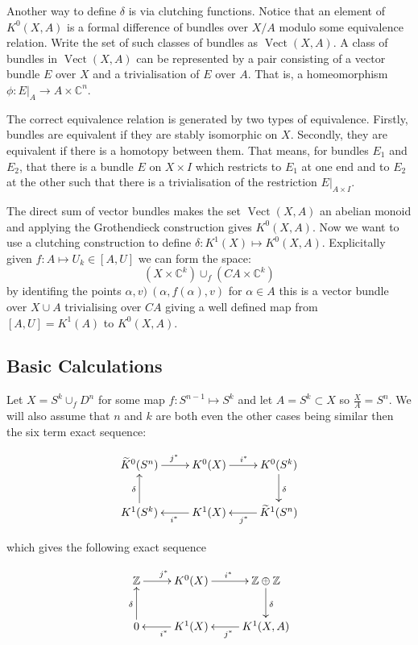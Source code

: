 \documentclass[a4paper,10pt]{article}
\theoremstyle{plain}%
\theoremstyle{definition}
\theoremstyle{remark}
\newcommand{\ZZ}{\mathbb{Z}}
\newcommand{\CC}{\mathbb{C}}
\newcommand{\KR}{\widetilde{K}}   %
\DeclareMathOperator{\Vect}{Vect}
\begin{document}
Another way to define $\delta$ is via clutching functions. Notice that
an element of $K^0(X,A)$ is a formal difference of bundles over $X/A$
modulo some equivalence relation. Write the set of such classes of
bundles as $\Vect(X,A)$. A class of bundles in $\Vect(X,A)$ can be
represented by a pair consisting of a vector bundle $E$ over $X$ and a
trivialisation of $E$ over $A$. That is, a homeomorphism $\phi:
E|_A\to A\times \CC^n$.

The correct equivalence relation is generated by two types of
equivalence. Firstly, bundles are equivalent if they are stably
isomorphic on $X$. Secondly, they are equivalent if there is a
homotopy between them. That means, for bundles $E_1$ and $E_2$, that
there is a bundle $E$ on $X\times I$ which restricts to $E_1$ at one
end and to $E_2$ at the other such that there is a trivialisation of
the restriction $E|_{A\times I}$.

The direct sum of vector bundles makes the set $\Vect(X,A)$ an abelian
monoid and applying the Grothendieck construction gives
$K^0(X,A)$. Now we want to use a clutching construction to define 
$\delta:K^1(X)\mapsto K^0(X,A)$. Explicitally given $f:A\mapsto U_k\in[A,U]$ 
we can form the space:
$$(X\times \CC^k)\cup_f(C A\times\CC^k)$$
by identifing the points $\alpha,v)~(\alpha,f(\alpha),v)$ for $\alpha\in A$ 
this is a vector bundle over $X\cup A$ trivialising over $C A$ giving a 
well defined map from $[A,U]=K^1(A)$ to $K^0(X,A)$.

\subsection{Basic Calculations}

Let $X=S^k\cup_fD^n$ for some map $f:S^{n-1}\mapsto S^k$ and let $A=S^k\subset X$ so
$\frac{X}{A}=S^n$. We will also assume that $n$ and $k$ are both even the other cases
being similar then the six term exact sequence:

\begin{equation}
  \xymatrix{
    \KR^0(S^n) \ar[r]^{j^*} & K^0(X) \ar[r]^{i^*} & K^0(S^k)\ar[d]^{\delta}\\
    K^1(S^k)\ar[u]^{\delta} & K^1(X)\ar[l]^{i^*} & \KR^1(S^n)\ar[l]^{j^*}
  }
\end{equation}

which gives the following exact sequence

\begin{equation}
  \label{stes}
  \xymatrix{
    \ZZ \ar[r]^{j^*} & K^0(X) \ar[r]^{i^*} & \ZZ\oplus\ZZ\ar[d]^{\delta}\\
    0 \ar[u]^{\delta} & K^1(X)\ar[l]^{i^*} & K^1(X,A)\ar[l]^{j^*}
  }
\end{equation}
\end{document}
